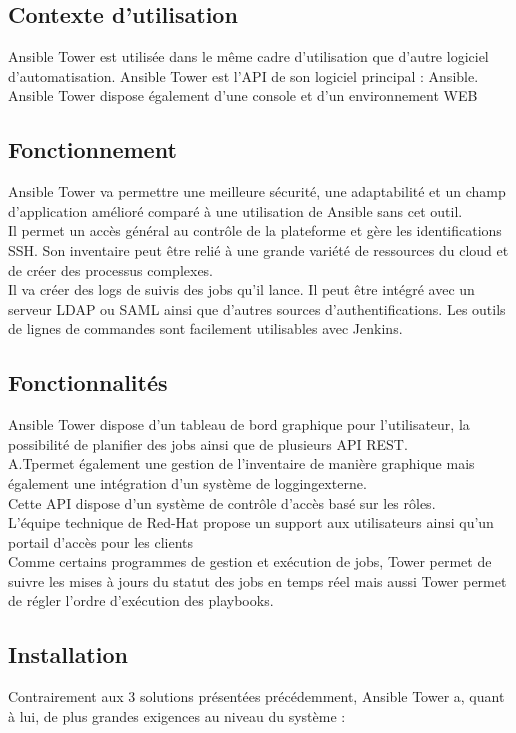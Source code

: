 \documentclass[12pt]{article}
\begin{document}
\subsection{Contexte d'utilisation}
Ansible Tower est utilisée dans le même cadre d'utilisation que d'autre logiciel d'automatisation. Ansible Tower est l'API de son logiciel principal : Ansible. 
\\
Ansible Tower dispose également d'une console et d'un environnement WEB

\subsection{Fonctionnement}
Ansible Tower va permettre une meilleure sécurité, une adaptabilité et un champ d’application amélioré comparé à une utilisation de Ansible sans cet outil. 
\\
Il permet un accès général au contrôle de la plateforme et gère les identifications SSH. Son inventaire peut être relié à une grande variété de ressources du cloud et de créer des processus complexes. 
\\
Il va créer des logs de suivis des jobs qu'il lance. Il peut être intégré avec un serveur LDAP ou SAML ainsi que d’autres sources d’authentifications. Les outils de lignes de commandes sont facilement utilisables avec Jenkins.

\subsection{Fonctionnalités}
Ansible Tower dispose d'un tableau de bord graphique pour l'utilisateur, la possibilité de planifier des jobs ainsi que de plusieurs API REST. 
\\
A.T\footnotemark[1] permet également une gestion de l'inventaire de manière graphique mais également une intégration d'un système de logging\footnotemark[2] externe.
\\
Cette API dispose d'un système de contrôle d'accès basé sur les rôles.
\\
L'équipe technique de Red-Hat propose un support aux utilisateurs ainsi qu'un portail d'accès pour les clients
\\
Comme certains programmes de gestion et exécution de jobs, Tower permet de suivre les mises à jours du statut des jobs en temps réel mais aussi Tower permet de régler l'ordre d'exécution des playbooks.

\subsection{Installation}
Contrairement aux 3 solutions présentées précédemment, Ansible Tower a, quant à lui, de plus grandes exigences au niveau du système :
\end{document}
